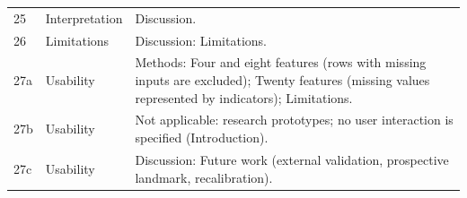 \documentclass[9pt]{extarticle}
\begin{document}
\begin{longtable}{@{}p{}p{}p{}@{}}
25 & Interpretation & Discussion. \\
26 & Limitations & Discussion: Limitations. \\
27a & Usability & Methods: Four and eight features (rows with missing inputs are excluded); Twenty features (missing values represented by indicators); Limitations. \\
27b & Usability & Not applicable: research prototypes; no user interaction is specified (Introduction). \\
27c & Usability & Discussion: Future work (external validation, prospective landmark, recalibration). \\
\bottomrule
\end{longtable}
\end{document}
